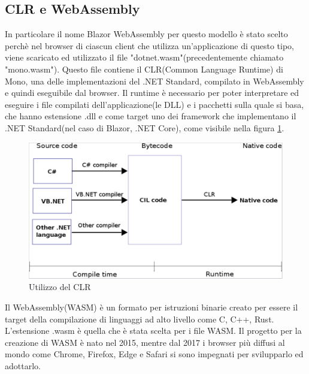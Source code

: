 \subsection{CLR e WebAssembly}\label{sez:webAssembly}
In particolare il nome Blazor WebAssembly per questo modello \`e stato scelto perch\`e nel browser di ciascun client che utilizza un'applicazione di questo tipo, viene scaricato ed utilizzato il file "dotnet.wasm"(precedentemente chiamato "mono.wasm").
Questo file contiene il CLR(Common Language Runtime) di Mono, una delle implementazioni del .NET Standard, compilato in WebAssembly e quindi eseguibile dal browser.
Il runtime \`e necessario per poter interpretare ed eseguire i file compilati dell'applicazione(le DLL) e i pacchetti sulla quale si basa, che hanno estensione .dll e come target uno dei framework che implementano il .NET Standard(nel caso di Blazor, .NET Core), come visibile nella figura \ref{fig:CLR}.

\begin{figure}[H]
	\centerline{\includegraphics[scale=0.5]{figure/CLR.PNG}}
	\caption{Utilizzo del CLR}
	\label{fig:CLR}
\end{figure}

Il WebAssembly(WASM) \`e un formato per istruzioni binarie creato per essere il target della compilazione di linguaggi ad alto livello come C, C++, Rust\cite{webAssemblyOfficialWebsite}.
L'estensione .wasm \`e quella che \`e stata scelta per i file WASM.
Il progetto per la creazione di WASM \`e nato nel 2015, mentre dal 2017 i browser pi\`u diffusi al mondo come Chrome, Firefox, Edge e Safari si sono impegnati per svilupparlo ed adottarlo\cite{webAssemblySupport}.


